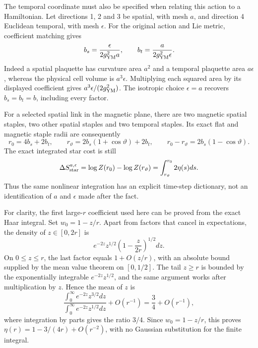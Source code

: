 \documentclass[
  11pt,
]{article}
\begin{document}
The temporal coordinate must also be specified when relating this action
to a Hamiltonian. Let directions 1, 2 and 3 be spatial, with mesh \(a\),
and direction 4 Euclidean temporal, with mesh \(\epsilon\). For the
original action and Lie metric, coefficient matching gives \[
 b_s=\frac{\epsilon}{2g_{\rm YM}^2a},\qquad
 b_t=\frac{a}{2g_{\rm YM}^2\epsilon}.
\] Indeed a spatial plaquette has curvature area \(a^2\) and a temporal
plaquette area \(a\epsilon\), whereas the physical cell volume is
\(a^3\epsilon\). Multiplying each squared area by its displayed
coefficient gives \(a^3\epsilon/(2g_{\rm YM}^2)\). The isotropic choice
\(\epsilon=a\) recovers \(b_s=b_t=b\), including every factor.

For a selected spatial link in the magnetic plane, there are two
magnetic spatial staples, two other spatial staples and two temporal
staples. Its exact flat and magnetic staple radii are consequently \[
 r_0=4b_s+2b_t,\qquad
 r_\vartheta=2b_s(1+\cos\vartheta)+2b_t,
 \qquad r_0-r_\vartheta=2b_s(1-\cos\vartheta).
\] The exact integrated star cost is still \[
 \Delta S^{a,\epsilon}_{\rm star}
 =\log Z(r_0)-\log Z(r_\vartheta)
 =\int_{r_\vartheta}^{r_0}2\eta(s)ds.
\] Thus the same nonlinear integration has an explicit time-step
dictionary, not an identification of \(a\) and \(\epsilon\) made after
the fact.

For clarity, the first large-\(r\) coefficient used here can be proved
from the exact Haar integral. Set \(w_0=1-z/r\). Apart from factors that
cancel in expectations, the density of \(z\in[0,2r]\) is \[
 e^{-2z}z^{1/2}\left(1-\frac z{2r}\right)^{1/2}dz.
\] On \(0\leq z\leq r\), the last factor equals \(1+O(z/r)\), with an
absolute bound supplied by the mean value theorem on \([0,1/2]\). The
tail \(z\geq r\) is bounded by the exponentially integrable
\(e^{-2z}z^{1/2}\), and the same argument works after multiplication by
\(z\). Hence the mean of \(z\) is \[
 \frac{\int_0^\infty e^{-2z}z^{3/2}dz}
      {\int_0^\infty e^{-2z}z^{1/2}dz}+O(r^{-1})
 =\frac34+O(r^{-1}),
\] where integration by parts gives the ratio \(3/4\). Since
\(w_0=1-z/r\), this proves \(\eta(r)=1-3/(4r)+O(r^{-2})\), with no
Gaussian substitution for the finite integral.
\end{document}
